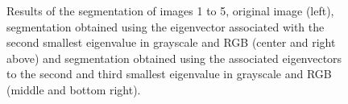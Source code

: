 \documentclass[conference]{IEEEtran}
\begin{document}
\begin{figure}[htbp]
\caption{Results of the segmentation of images 1 to 5, original image (left), segmentation obtained using the eigenvector associated with the second smallest eigenvalue in grayscale and RGB (center and right above) and segmentation obtained using the associated eigenvectors to the second and third smallest eigenvalue in grayscale and RGB (middle and bottom right).}
\label{res1}
\end{figure}
\end{document}
